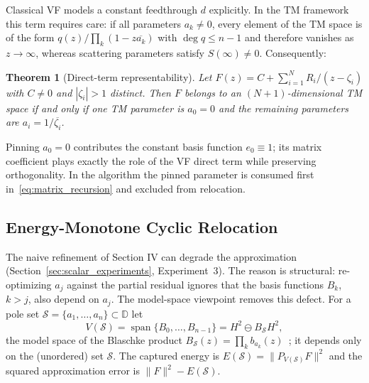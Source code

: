 \documentclass[journal]{IEEEtran}%
\newtheorem{theorem}{Theorem}
\newcommand{\conj}[1]{\overline{#1}}
\begin{document}
Classical VF models a constant feedthrough $d$ explicitly. In the TM framework this term requires care: if all parameters $a_k \neq 0$, every element of the TM space is of the form $q(z)/\prod_k (1 - z\conj{a_k})$ with $\deg q \le n-1$ and therefore vanishes as $z \to \infty$, whereas scattering parameters satisfy $S(\infty) \neq 0$. Consequently:

\begin{theorem}[Direct-term representability]\label{lem:direct}
Let $F(z) = C + \sum_{i=1}^{N} R_i/(z - \zeta_i)$ with $C \neq 0$ and $|\zeta_i| > 1$ distinct. Then $F$ belongs to an $(N{+}1)$-dimensional TM space if and only if one TM parameter is $a_0 = 0$ and the remaining parameters are $a_i = 1/\conj{\zeta_i}$.
\end{theorem}

Pinning $a_0 = 0$ contributes the constant basis function $e_0 \equiv 1$; its matrix coefficient plays exactly the role of the VF direct term while preserving orthogonality. In the algorithm the pinned parameter is consumed first in~\eqref{eq:matrix_recursion} and excluded from relocation.

\subsection{Energy-Monotone Cyclic Relocation}

The naive refinement of Section IV can degrade the approximation (Section~\ref{sec:scalar_experiments}, Experiment~3). The reason is structural: re-optimizing $a_j$ against the partial residual ignores that the basis functions $B_k$, $k > j$, also depend on $a_j$. The model-space viewpoint removes this defect. For a pole set $\mathcal{S} = \{a_1,\dots,a_n\} \subset \mathbb{D}$ let
\begin{equation}
  V(\mathcal{S}) = \operatorname{span}\{B_0,\dots,B_{n-1}\} = H^2 \ominus B_{\mathcal{S}} H^2,
\end{equation}
the model space of the Blaschke product $B_{\mathcal{S}}(z) = \prod_{k} b_{a_k}(z)$~\cite{garnett2007bounded}; it depends only on the (unordered) set $\mathcal{S}$. The captured energy is $E(\mathcal{S}) = \| P_{V(\mathcal{S})} F \|^2$ and the squared approximation error is $\|F\|^2 - E(\mathcal{S})$.
\end{document}
